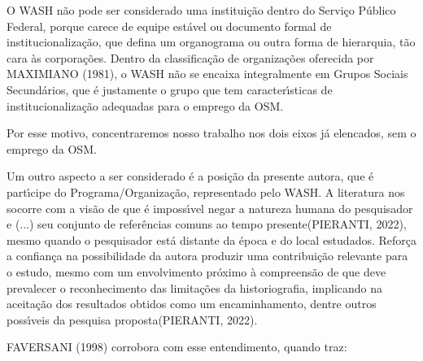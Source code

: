 \documentclass[
12pt,		%
openright,	%
twoside,  %
a4paper,			%
chapter=TITLE,		%
english,			%
french,				%
spanish,			%
brazil				%
]{USPSC-classe/USPSC}
\begin{document}
\noindent\begin{center}\mbox{\centering{}}\end{center}


O WASH n\~ao pode ser considerado uma institui\c{c}\~ao dentro do Servi\c{c}o P\'ublico Federal, porque carece de equipe est\'avel ou documento formal de institucionaliza\c{c}\~ao, que defina um organograma ou outra forma de hierarquia, t\~ao cara \`as corpora\c{c}\~oes. Dentro da classifica\c{c}\~ao de organiza\c{c}\~oes oferecida por MAXIMIANO (1981), o WASH n\~ao se encaixa integralmente em \textquotedbl Grupos Sociais Secund\'arios\textquotedbl , que \'e justamente o grupo que tem caracter\'{\i}sticas de institucionaliza\c{c}\~ao adequadas para o emprego da OSM.








Por esse motivo, concentraremos nosso trabalho nos dois eixos j\'a elencados, sem o emprego da OSM.








Um outro aspecto a ser considerado \'e a posi\c{c}\~ao da presente autora, que \'e part\'{\i}cipe do Programa/Organiza\c{c}\~ao, representado pelo WASH. A literatura nos socorre com a vis\~ao de que \'e imposs\'{\i}vel \textquotedbl negar a natureza humana do pesquisador e (...) seu conjunto de refer\^encias comuns ao tempo presente\textquotedbl  (PIERANTI, 2022), mesmo quando o pesquisador est\'a \textquotedbl distante da \'epoca e do local estudados\textquotedbl . Refor\c{c}a a confian\c{c}a na possibilidade da autora produzir uma contribui\c{c}\~ao relevante para o  estudo, mesmo com um envolvimento pr\'oximo  \`a compreens\~ao de que \textquotedbl deve prevalecer o reconhecimento das limita\c{c}\~oes da historiografia, implicando na aceita\c{c}\~ao dos resultados obtidos como um encaminhamento, dentre outros poss\'{\i}veis da pesquisa proposta\textquotedbl  (PIERANTI, 2022).








 FAVERSANI (1998) corrobora com esse entendimento, quando traz:
\end{document}
